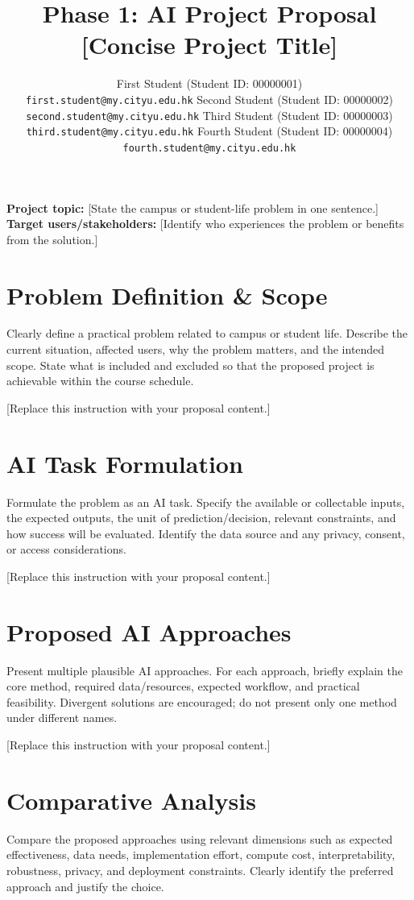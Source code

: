 \documentclass{article}
\title{Phase 1: AI Project Proposal\\
\large [Concise Project Title]}
\author{
  First Student (Student ID: 00000001)\\
  \texttt{first.student@my.cityu.edu.hk}
  \And
  Second Student (Student ID: 00000002)\\
  \texttt{second.student@my.cityu.edu.hk}
  \AND
  Third Student (Student ID: 00000003)\\
  \texttt{third.student@my.cityu.edu.hk}
  \And
  Fourth Student (Student ID: 00000004)\\
  \texttt{fourth.student@my.cityu.edu.hk}
}
\begin{document}
\maketitle

\noindent\textbf{Project topic:} [State the campus or student-life problem in one sentence.]\\
\textbf{Target users/stakeholders:} [Identify who experiences the problem or benefits from the solution.]


\section{Problem Definition \& Scope}
Clearly define a practical problem related to campus or student life. Describe the current situation, affected users, why the problem matters, and the intended scope. State what is included and excluded so that the proposed project is achievable within the course schedule.

[Replace this instruction with your proposal content.]

\section{AI Task Formulation}
Formulate the problem as an AI task. Specify the available or collectable inputs, the expected outputs, the unit of prediction/decision, relevant constraints, and how success will be evaluated. Identify the data source and any privacy, consent, or access considerations.

[Replace this instruction with your proposal content.]

\section{Proposed AI Approaches}
Present multiple plausible AI approaches. For each approach, briefly explain the core method, required data/resources, expected workflow, and practical feasibility. Divergent solutions are encouraged; do not present only one method under different names.

[Replace this instruction with your proposal content.]

\section{Comparative Analysis}
Compare the proposed approaches using relevant dimensions such as expected effectiveness, data needs, implementation effort, compute cost, interpretability, robustness, privacy, and deployment constraints. Clearly identify the preferred approach and justify the choice.
\end{document}
